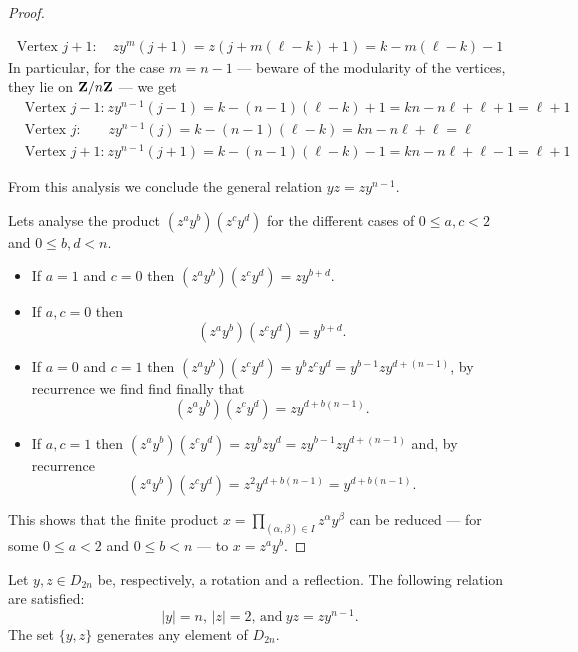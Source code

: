 \begin{proof}
\begin{itemize}
\begin{gather*}
        \text{Vertex } j + 1: \quad
        z y^m(j + 1) = z(j + m (\ell - k) + 1) = k - m (\ell - k) - 1
      \end{gather*}
      In particular, for the case \(m = n - 1\) --- beware of the modularity of
      the vertices, they lie on \(\mathbf{Z}/n\mathbf{Z}\) --- we get
      \begin{align*}
        &\text{Vertex } j - 1\text{:}\
        zy^{n-1}(j - 1)
        = k - (n - 1) (\ell - k) + 1
        = k n - n \ell + \ell + 1
        = \ell + 1
        \\
        &\text{Vertex } j\text{:} \qquad
        zy^{n-1}(j)
        = k - (n - 1) (\ell - k)
        = kn - n \ell + \ell
        = \ell
        \\
        &\text{Vertex } j + 1\text{:}\
        zy^{n-1}(j + 1)
        = k - (n - 1) (\ell - k) - 1
        = k n - n \ell + \ell - 1
        = \ell + 1
      \end{align*}
  \end{itemize}
  From this analysis we conclude the general relation \(y z = z y^{n-1}\).

  Lets analyse the product \((z^a y^b)(z^c y^d)\) for the different cases of \(0
  \leq a, c < 2\) and \(0 \leq b, d < n\).
  \begin{itemize}
    \item If \(a = 1\) and \(c = 0\) then \((z^a y^b)(z^c y^d) = z y^{b + d}\).
    \item If \(a, c = 0\) then
      \[
        (z^a y^b)(z^c y^d) = y^{b + d}.
      \]
    \item If \(a = 0\) and \(c = 1\) then \((z^a y^b)(z^c y^d) = y^b z^c y^d =
      y^{b-1} z y^{d + (n - 1)}\), by recurrence we find find finally that
      \[
        (z^a y^b)(z^c y^d) = z y^{d + b(n - 1)}.
      \]
    \item If \(a, c = 1\) then \((z^a y^b)(z^c y^d) = z y^b z y^d = z y^{b-1} z
      y^{d + (n - 1)}\) and, by recurrence
      \[
        (z^a y^b)(z^c y^d) = z^2 y^{d + b(n - 1)} = y^{d + b(n - 1)}.
      \]
  \end{itemize}
  This shows that the finite product \(x = \prod_{(\alpha, \beta) \in I}
  z^\alpha y^\beta\) can be reduced --- for some \(0 \leq a < 2\) and \(0 \leq b
  < n\) --- to \(x = z^a y^b\).
\end{proof}

\begin{corollary}
  Let \(y, z \in D_{2n}\) be, respectively, a rotation and a reflection. The
  following relation are satisfied:
  \[
    |y| = n \text{, } |z| = 2 \text{, and}\ yz = z y^{n-1}.
  \]
  The set \(\{y, z\}\) generates any element of \(D_{2n}\).
\end{corollary}

